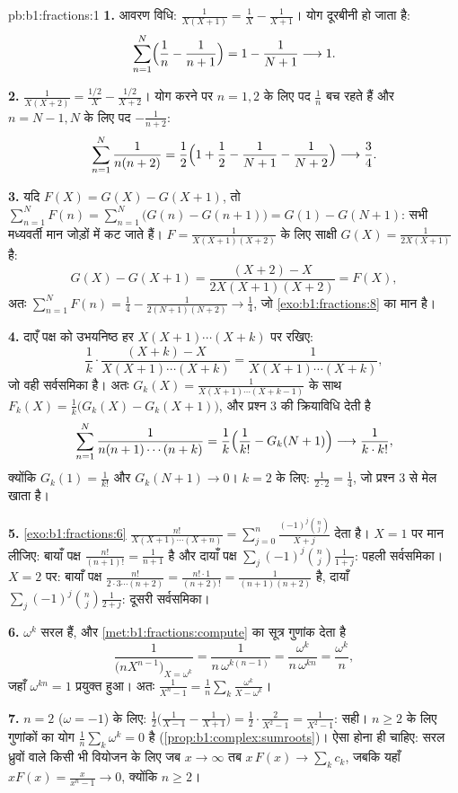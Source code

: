 \begin{solution}{pb:b1:fractions:1}
\textbf{1.} आवरण विधि: $\frac1{X(X+1)} = \frac1X - \frac1{X+1}$। योग दूरबीनी
हो जाता है:
\[
\sum_{n=1}^{N}\Bigl(\frac1n - \frac1{n+1}\Bigr)
= 1 - \frac1{N+1} \longrightarrow 1 .
\]

\textbf{2.} $\frac1{X(X+2)} = \frac{1/2}X - \frac{1/2}{X+2}$। योग करने पर $n
= 1, 2$ के लिए पद $\frac1n$ बच रहते हैं और $n = N-1, N$ के लिए पद
$-\frac1{n+2}$:
\[
\sum_{n=1}^{N}\frac1{n(n+2)}
= \frac12\Bigl(1 + \frac12 - \frac1{N+1} - \frac1{N+2}\Bigr)
\longrightarrow \frac34 .
\]

\textbf{3.} यदि $F(X) = G(X) - G(X+1)$, तो $\sum_{n=1}^N F(n) =
\sum_{n=1}^N\bigl(G(n) - G(n+1)\bigr) = G(1) - G(N+1)$: सभी मध्यवर्ती मान
जोड़ों में कट जाते हैं। $F = \frac1{X(X+1)(X+2)}$ के लिए साक्षी $G(X) =
\frac1{2X(X+1)}$ है:
\[
G(X) - G(X+1)
= \frac{(X+2) - X}{2X(X+1)(X+2)} = F(X) ,
\]
अतः $\sum_{n=1}^N F(n) = \frac14 - \frac1{2(N+1)(N+2)} \to \frac14$, जो
\cref{exo:b1:fractions:8} का मान है।

\textbf{4.} दाएँ पक्ष को उभयनिष्ठ हर $X(X+1)\cdots(X+k)$ पर रखिए:
\[
\frac1k\cdot\frac{(X + k) - X}{X(X+1)\cdots(X+k)}
= \frac{1}{X(X+1)\cdots(X+k)} ,
\]
जो वही सर्वसमिका है। अतः $G_k(X) = \frac1{X(X+1)\cdots(X+k-1)}$ के साथ
$F_k(X) = \frac1k\bigl(G_k(X) - G_k(X+1)\bigr)$, और प्रश्न 3 की क्रियाविधि
देती है
\[
\sum_{n=1}^{N}\frac1{n(n+1)\cdots(n+k)}
= \frac1k\Bigl(\frac1{k!} - G_k(N+1)\Bigr)
\longrightarrow \frac1{k\cdot k!} ,
\]
क्योंकि $G_k(1) = \frac1{k!}$ और $G_k(N+1) \to 0$। $k = 2$ के लिए:
$\frac1{2\cdot2} = \frac14$, जो प्रश्न 3 से मेल खाता है।

\textbf{5.} \cref{exo:b1:fractions:6} $\frac{n!}{X(X+1)\cdots(X+n)} =
\sum_{j=0}^n \frac{(-1)^j\binom nj}{X + j}$ देता है। $X = 1$ पर मान लीजिए:
बायाँ पक्ष $\frac{n!}{(n+1)!} = \frac1{n+1}$ है और दायाँ पक्ष
$\sum_j(-1)^j\binom nj\frac1{1+j}$: पहली सर्वसमिका। $X = 2$ पर: बायाँ पक्ष
$\frac{n!}{2\cdot3\cdots(n+2)} = \frac{n!\cdot1}{(n+2)!} =
\frac1{(n+1)(n+2)}$ है, दायाँ $\sum_j(-1)^j\binom nj\frac1{2+j}$: दूसरी
सर्वसमिका।

\textbf{6.}  $\omega^k$ सरल हैं, और \cref{met:b1:fractions:compute} का
 सूत्र गुणांक देता है
\[
\frac{1}{\bigl(nX^{n-1}\bigr)_{X = \omega^k}}
= \frac{1}{n\,\omega^{k(n-1)}}
= \frac{\omega^k}{n\,\omega^{kn}} = \frac{\omega^k}n ,
\]
जहाँ $\omega^{kn} = 1$ प्रयुक्त हुआ। अतः $\frac1{X^n-1} = \frac1n\sum_k
\frac{\omega^k}{X - \omega^k}$।

\textbf{7.} $n = 2$ ($\omega = -1$) के लिए: $\frac12\bigl( \frac1{X-1} -
\frac1{X+1}\bigr) = \frac12\cdot\frac{2}{X^2-1} = \frac1{X^2-1}$: सही। $n
\geq 2$ के लिए गुणांकों का योग $\frac1n\sum_k\omega^k = 0$ है
(\cref{prop:b1:complex:sumroots})। ऐसा होना ही चाहिए: सरल ध्रुवों वाले किसी
भी वियोजन के लिए जब $x \to \infty$ तब $x\,F(x) \to \sum_k c_k$, जबकि यहाँ
$xF(x) = \frac{x}{x^n-1} \to 0$, क्योंकि $n \geq 2$।


\end{solution}
